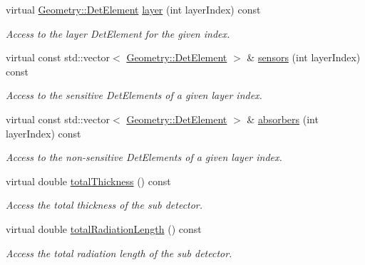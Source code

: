 \begin{DoxyCompactItemize}
virtual \hyperlink{class_d_d4hep_1_1_geometry_1_1_det_element}{Geometry::DetElement} \hyperlink{class_d_d4hep_1_1_d_d_rec_1_1_layering_extension_impl_a2c672b63b63396c9751044089a13eea3}{layer} (int layerIndex) const 
\begin{DoxyCompactList}\small\item\em Access to the layer DetElement for the given index. \item\end{DoxyCompactList}\item 
virtual const std::vector$<$ \hyperlink{class_d_d4hep_1_1_geometry_1_1_det_element}{Geometry::DetElement} $>$ \& \hyperlink{class_d_d4hep_1_1_d_d_rec_1_1_layering_extension_impl_a19380a0d054c47913fb3121457cef04d}{sensors} (int layerIndex) const 
\begin{DoxyCompactList}\small\item\em Access to the sensitive DetElements of a given layer index. \item\end{DoxyCompactList}\item 
virtual const std::vector$<$ \hyperlink{class_d_d4hep_1_1_geometry_1_1_det_element}{Geometry::DetElement} $>$ \& \hyperlink{class_d_d4hep_1_1_d_d_rec_1_1_layering_extension_impl_ab7007d1f2250d46b4fe6ad14213c40dd}{absorbers} (int layerIndex) const 
\begin{DoxyCompactList}\small\item\em Access to the non-\/sensitive DetElements of a given layer index. \item\end{DoxyCompactList}\item 
virtual double \hyperlink{class_d_d4hep_1_1_d_d_rec_1_1_layering_extension_impl_ae245b5a3f6ff14a5c6ab521219695a87}{totalThickness} () const 
\begin{DoxyCompactList}\small\item\em Access the total thickness of the sub detector. \item\end{DoxyCompactList}\item 
virtual double \hyperlink{class_d_d4hep_1_1_d_d_rec_1_1_layering_extension_impl_a220aae6042be5005f3f51367cee0a314}{totalRadiationLength} () const 
\begin{DoxyCompactList}\small\item\em Access the total radiation length of the sub detector. \item\end{DoxyCompactList}\item 

\end{DoxyCompactItemize}
